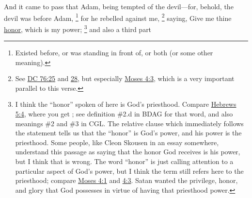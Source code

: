 		And it came to pass that Adam, being tempted of the devil---for, behold, the devil was before Adam,%
			\footnote{%
				Existed before, or was standing in front of, or both (or some other meaning).
				}
		for he rebelled against me,%
		\footnote{%
			See \hyperref[DC76-25]{DC 76:25} and \hyperref[DC76-28]{28}, but especially \hyperref[MOSES-4-3]{Moses 4:3}, which is a very important parallel to this verse.
			} 
		saying, Give me thine \hyperref[HONOR]{honor}, which is my power;%
			\footnote{%
				I think the ``honor'' spoken of here is God's priesthood. Compare \hyperref[HEBREWS-5-4]{Hebrews 5:4}, where you get \hyperref[TIME-2]{}; see definition \#2.d in BDAG for that word, and also meanings \#2 and \#3 in CGL. The relative clause which immediately follows the statement tells us that the ``honor'' is God's power, and his power is the priesthood. Some people, like Cleon Skousen in an essay somewhere, understand this passage as saying that the honor God receives is his power, but I think that is wrong. The word ``honor'' is just calling attention to a particular aspect of God's power, but I think the term still refers here to the priesthood; compare \hyperref[MOSES-4-1]{Moses 4:1} and \hyperref[MOSES-4-3]{4:3}. Satan wanted the privilege, honor, and glory that God possesses in virtue of having that priesthood power.
				}
		and also a third part%

